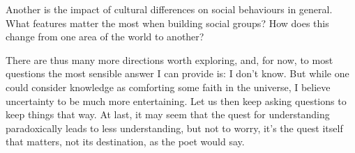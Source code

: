 \documentclass[../thesis.tex]{subfiles}
\begin{document}
Another is the impact of cultural differences on social behaviours in general. What
features matter the most when building social groups? How does this change from one area
of the world to another?

There are thus many more directions worth exploring, and, for now, to most questions the
most sensible answer I can provide is: I don't know. But while one could consider
knowledge as comforting some faith in the universe, I believe uncertainty to be much
more entertaining. Let us then keep asking questions to keep things that way.
At last, it may seem that the quest for understanding paradoxically leads to less
understanding, but not to worry,
it's the quest itself that matters, not its destination, as the poet would say.
\end{document}
